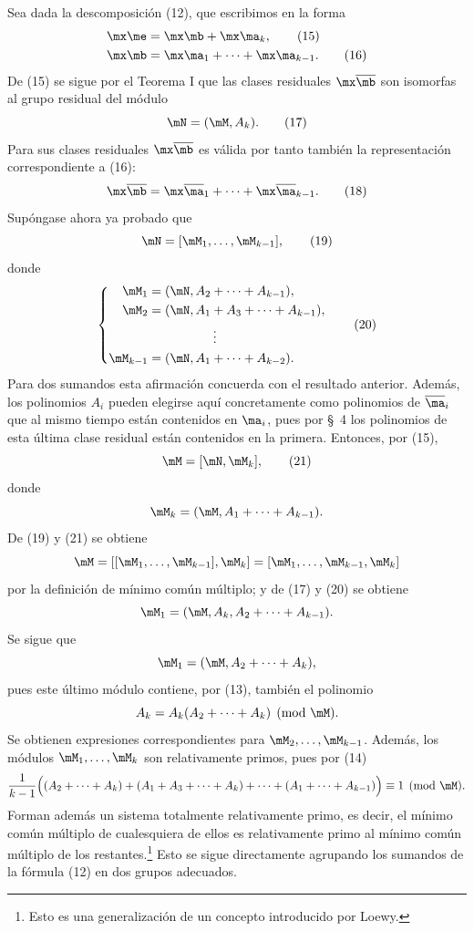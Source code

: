 \documentclass[11pt]{article}
\begin{document}
Sea dada la descomposición (12), que escribimos en la forma
\begin{align}
 \mx\me&=\mx\mb+\mx\ma_k,\tag{15}\\
 \mx\mb&=\mx\ma_1+\cdots+\mx\ma_{k-1}.\tag{16}
\end{align}
De (15) se sigue por el Teorema I que las clases residuales $\mx\overline{\mb}$ son isomorfas al grupo residual del módulo
\begin{equation}
 \mN=(\mM,A_k).
\tag{17}
\end{equation}
Para sus clases residuales $\mx\overline{\mb}$ es válida por tanto también la representación correspondiente a (16):
\begin{equation}
 \mx\overline{\mb}=\mx\overline{\ma}_1+\cdots+\mx\overline{\ma}_{k-1}.
\tag{18}
\end{equation}
Supóngase ahora ya probado que
\begin{equation}
 \mN=[\mM_1,\ldots,\mM_{k-1}],
\tag{19}
\end{equation}
donde
\begin{equation}
\left\{
\begin{aligned}
 \mM_1&=(\mN,A_2+\cdots+A_{k-1}),\\
 \mM_2&=(\mN,A_1+A_3+\cdots+A_{k-1}),\\
 &\hspace{1.8cm}\vdots\\
 \mM_{k-1}&=(\mN,A_1+\cdots+A_{k-2}).
\end{aligned}\right.
\tag{20}
\end{equation}
Para dos sumandos esta afirmación concuerda con el resultado anterior. Además, los polinomios $A_i$ pueden elegirse aquí concretamente como polinomios de $\overline{\ma}_i$ que al mismo tiempo están contenidos en $\ma_i$, pues por \S~4 los polinomios de esta última clase residual están contenidos en la primera. Entonces, por (15),
\begin{equation}
 \mM=[\mN,\mM_k],
\tag{21}
\end{equation}
donde
\[
 \mM_k=(\mM,A_1+\cdots+A_{k-1}).
\]
De (19) y (21) se obtiene
\[
 \mM=[[\mM_1,
 \ldots,\mM_{k-1}],\mM_k]=[\mM_1,\ldots,\mM_{k-1},\mM_k]
\]
por la definición de mínimo común múltiplo; y de (17) y (20) se obtiene
\[
 \mM_1=(\mM,A_k,A_2+\cdots+A_{k-1}).
\]
Se sigue que
\[
 \mM_1=(\mM,A_2+\cdots+A_k),
\]
pues este último módulo contiene, por (13), también el polinomio
\[
 A_k=A_k(A_2+\cdots+A_k)\pmod{\mM}.
\]
Se obtienen expresiones correspondientes para $\mM_2,\ldots,\mM_{k-1}$. Además, los módulos $\mM_1,\ldots,\mM_k$ son relativamente primos, pues por (14)
\[
 \frac{1}{k-1}\Bigl((A_2+\cdots+A_k)+(A_1+A_3+\cdots+A_k)+\cdots+(A_1+\cdots+A_{k-1})\Bigr)\equiv1\pmod{\mM}.
\]
Forman además un sistema totalmente relativamente primo, es decir, el mínimo común múltiplo de cualesquiera de ellos es relativamente primo al mínimo común múltiplo de los restantes.\footnote{Esto es una generalización de un concepto introducido por Loewy.} Esto se sigue directamente agrupando los sumandos de la fórmula (12) en dos grupos adecuados.
\end{document}
